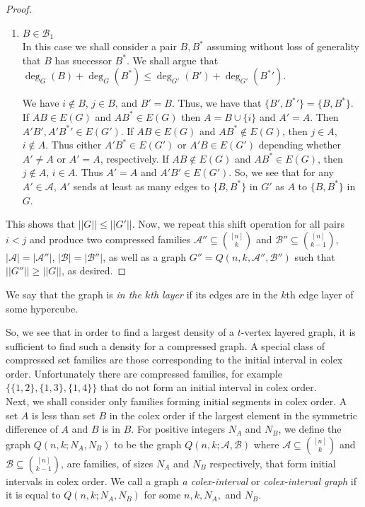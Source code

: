 \documentclass[11pt, a4paper]{article}
\newcommand{\cA}{\mathcal{A}}
\newcommand{\cB}{\mathcal{B}}
\newcommand{\cF}{\mathcal{F}}
\begin{document}
\begin{proof}
\begin{enumerate}
	
	\item{ }  $B\in \cB_1$\\
	In this case we shall consider a pair $B, B^*$ assuming without loss of generality that $B$ has successor $B^*$.
	We shall argue that $\deg_G(B)+\deg_G(B^*) \leq \deg_{G'}(B') +\deg_{G'}({B^*}')$.
	
	
	We have $i\not\in B$, $j\in B$, and $B' = B$. Thus, we have that $\{B', {B^*}'\}=\{B, B^*\}$.
	If $AB\in E(G)$ and $AB^*\in E(G)$ then $A=B\cup \{i\}$ and $A'=A$. Then $A'B', A'{B^*}' \in E(G')$.
	If $AB\in E(G)$ and $AB^*\not\in E(G)$, then $j\in A$, $i\not\in A$. Thus either $A'B^* \in E(G')$ or $A'B\in E(G')$ depending whether $A'\neq A$ or $A'=A$, respectively. 
	If $AB\not\in E(G)$ and $AB^*\in E(G)$, then  $j\not\in A$, $i\in A$. Thus $A' = A$ and $A'B'\in E(G')$.
	So, we see that for any $A'\in \cA$, $A'$ sends at least as many edges to $\{B, B^*\}$ in $G'$ as $A$ to   $\{B, B^*\}$ in $G$.
	\end{enumerate} 
	
	This shows that $||G||\leq ||G'||$. Now, we repeat this shift operation for all pairs $i<j$ and produce two compressed families $\cA'' \subseteq \binom{[n]}{k}$ and $\cB''\subseteq \binom{[n]}{k-1}$,  $|\cA|=|\cA''|$, $|\cB|=|\cB''|$, as well as a graph  $G''= Q(n, k, \cA'', \cB'')$ such that $||G''||\geq ||G||$, as desired.
	\end{proof}

\vskip 1cm 

We say that the graph is {\it in the $k$th layer} if its edges are in  the $k$th edge layer of some hypercube.


So, we see that in order to find a largest density of a $t$-vertex layered graph, it is sufficient to find such a density for a compressed graph. 
A special class of compressed set families are those corresponding to the initial interval in colex order. Unfortunately there are compressed families, for example $\{ \{1,2\}, \{1,3\}, \{1,4\}\}$ that do not form an initial interval in colex order. \\


Next, we shall consider only families forming initial segments in colex order.
A set $A$ is less than set $B$ in the colex order if the largest element in the symmetric difference of $A$ and $B$ is in $B$.
	For positive integers $N_A$ and $N_B$, we define the graph $Q(n,k;N_A,N_B)$ to be  the graph $Q(n,k;\cA,\cB)$ where $\cA\subseteq\binom{[n]}{k}$ and $\cB\subseteq\binom{[n]}{k-1}$, are families, of sizes $N_A$ and $N_B$ respectively, that form initial intervals in colex order. 
	We call a graph {\it a colex-interval}  or {\it colex-interval graph} if it is equal to $Q(n,k;N_A,N_B)$ for some $n, k, N_A, $ and $N_B$.
\end{document}

